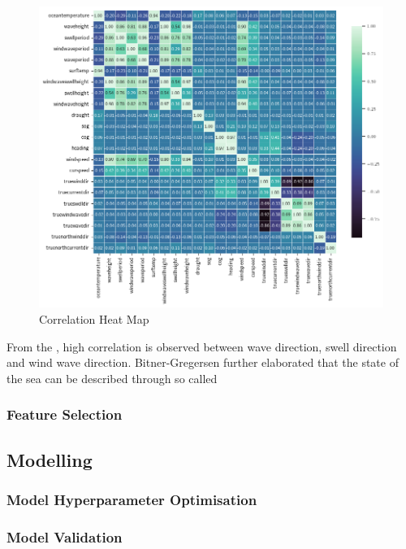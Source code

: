 \begin{figure}
    \includegraphics[width=\linewidth,height=\textheight,keepaspectratio]{02_figures/heatmap_corr_ovr.png}
    \caption{Correlation Heat Map}
    \label{fig:heatmap_ovr}
\end{figure}

From the , high correlation is observed between wave direction, swell direction and wind wave direction. Bitner-Gregersen further elaborated that the state of the sea can be described through so called   \cite{K.Torsethaugen.2004}



\subsubsection{Feature Selection}\label{wavedist}


\subsection{Modelling}\label{modelling}

\subsubsection{Model Hyperparameter Optimisation}\label{hpo}

\subsubsection{Model Validation}\label{model_validation}

